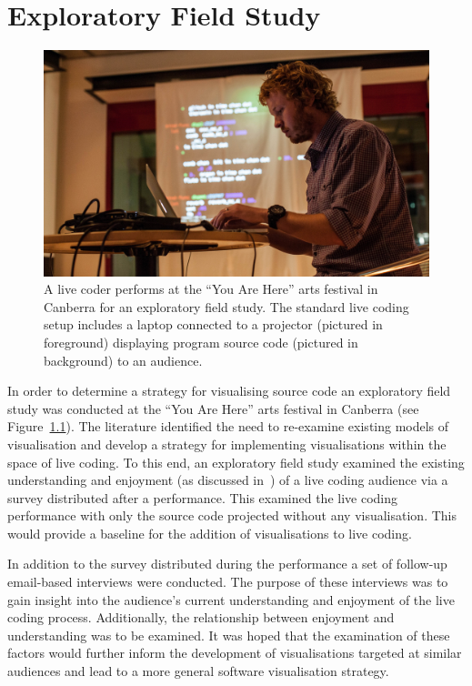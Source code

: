 
\chapter{Exploratory Field Study}
\label{chap:exploratory-field-study}

\begin{figure}
\centering
\includegraphics[width=1.0\textwidth]{../images/study-1-you-are-here-ben.jpg}
\caption[Standard live coding setup]{A live coder performs at the ``You Are Here'' arts festival in Canberra for an exploratory field study. The standard live coding setup includes a laptop connected to a projector (pictured in foreground) displaying program source code (pictured in background) to an audience.}
\label{fig:exploratory-field-study-ben}
\end{figure}


In order to determine a strategy for visualising source code an exploratory field study was conducted at the ``You Are Here'' arts festival in Canberra (see Figure~\ref{fig:exploratory-field-study-ben}). The literature identified the need to re-examine existing models of visualisation and develop a strategy for implementing visualisations within the space of live coding. To this end, an exploratory field study examined the existing understanding and enjoyment (as discussed in~\cite{McLean2010a}) of a live coding audience via a survey distributed after a performance. This examined the live coding performance with only the source code projected without any visualisation. This would provide a baseline for the addition of visualisations to live coding.

In addition to the survey distributed during the performance a set of follow-up email-based interviews were conducted. The purpose of these interviews was to gain insight into the audience's current understanding and enjoyment of the live coding process. Additionally, the relationship between enjoyment and understanding was to be examined. It was hoped that the examination of these factors would further inform the development of visualisations targeted at similar audiences and lead to a more general software visualisation strategy.

